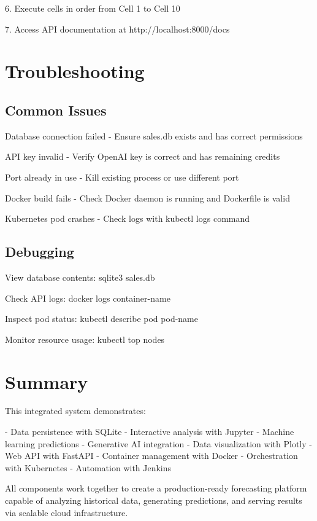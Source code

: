 \documentclass{article}
\begin{document}
6. Execute cells in order from Cell 1 to Cell 10

7. Access API documentation at http://localhost:8000/docs

\section{Troubleshooting}

\subsection{Common Issues}

Database connection failed - Ensure sales.db exists and has correct permissions

API key invalid - Verify OpenAI key is correct and has remaining credits

Port already in use - Kill existing process or use different port

Docker build fails - Check Docker daemon is running and Dockerfile is valid

Kubernetes pod crashes - Check logs with kubectl logs command

\subsection{Debugging}

View database contents: sqlite3 sales.db

Check API logs: docker logs container-name

Inspect pod status: kubectl describe pod pod-name

Monitor resource usage: kubectl top nodes

\section{Summary}

This integrated system demonstrates:

- Data persistence with SQLite
- Interactive analysis with Jupyter
- Machine learning predictions
- Generative AI integration
- Data visualization with Plotly
- Web API with FastAPI
- Container management with Docker
- Orchestration with Kubernetes
- Automation with Jenkins

All components work together to create a production-ready forecasting platform capable of analyzing historical data, generating predictions, and serving results via scalable cloud infrastructure.
\end{document}
